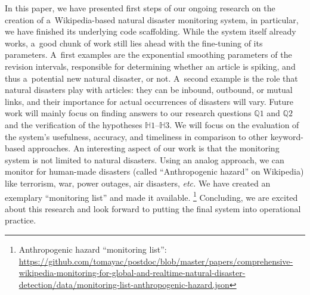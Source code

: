\documentclass[runningheads,a4paper]{llncs}
\begin{document}
In this paper, we have presented first steps of our ongoing research
on the creation of a~Wikipedia-based natural disaster monitoring system,
in particular, we have finished its underlying code scaffolding.
While the system itself already works, a~good chunk of work still lies ahead
with the fine-tuning of its parameters.
A~first examples are the exponential smoothing parameters
of the revision intervals, responsible for determining whether an article
is spiking, and thus a~potential new natural disaster, or not.
A~second example is the role that natural disasters play with articles:
they can be inbound, outbound, or mutual links,
and their importance for actual occurrences of disasters will vary.
Future work will mainly focus on finding answers to our research questions
$\mathbb{Q}1$ and $\mathbb{Q}2$ and the verification of the hypotheses
$\mathbb{H}1$--$\mathbb{H}3$.
We will focus on the evaluation of the system's usefulness, accuracy,
and timeliness in comparison to other keyword-based approaches.
An interesting aspect of our work is that the monitoring system
is not limited to natural disasters.
Using an analog approach, we can monitor for human-made disasters
(called ``Anthropogenic hazard'' on Wikipedia)
like terrorism, war, power outages, air disasters, \emph{etc.}
We have created an exemplary ``monitoring list'' and made it available.%
\footnote{Anthropogenic hazard ``monitoring list'':
\url{https://github.com/tomayac/postdoc/blob/master/papers/comprehensive-wikipedia-monitoring-for-global-and-realtime-natural-disaster-detection/data/monitoring-list-anthropogenic-hazard.json}}
Concluding, we are excited about this research
and look forward to putting the final system into operational practice.



\end{document}

